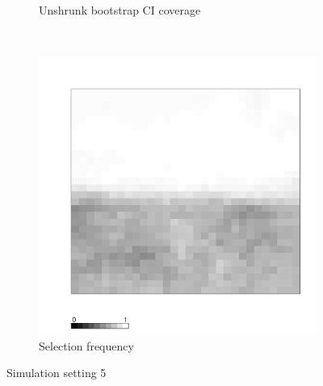 \documentclass[authoryear, review, 11pt]{elsarticle}
\begin{document}
\begin{figure}
\begin{subfigure}[b]{0.45\textwidth}
		\caption{Unshrunk bootstrap CI coverage}
	\end{subfigure}%
	~ %
	\begin{subfigure}[b]{0.45\textwidth}
	\centering
		\includegraphics[width=\textwidth]{../../figures/simulation/X1.15.5.selection.pdf}
		\caption{Selection frequency}
	\end{subfigure}
	\caption{Simulation setting 5}
\end{figure}

\clearpage
\end{document}

